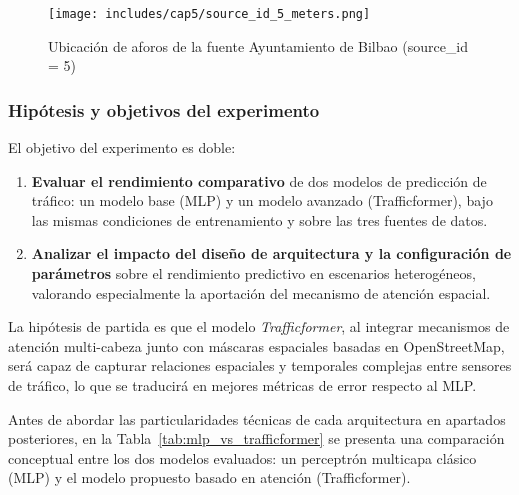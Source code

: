 \begin{figure}[H]
	\centering
	\texttt{[image: includes/cap5/source\_id\_5\_meters.png]}
	\caption{Ubicación de aforos de la fuente Ayuntamiento de Bilbao (source\_id = 5)}
	\label{fig:sourceid5_map}
\end{figure}

\subsubsection*{Hipótesis y objetivos del experimento}

El objetivo del experimento es doble:

\begin{enumerate}
	\item \textbf{Evaluar el rendimiento comparativo} de dos modelos de predicción de tráfico: un modelo base (MLP) y un modelo avanzado (Trafficformer), bajo las mismas condiciones de entrenamiento y sobre las tres fuentes de datos.
	\item \textbf{Analizar el impacto del diseño de arquitectura y la configuración de parámetros} sobre el rendimiento predictivo en escenarios heterogéneos, valorando especialmente la aportación del mecanismo de atención espacial.
\end{enumerate}

La hipótesis de partida es que el modelo \textit{Trafficformer}, al integrar mecanismos de atención multi-cabeza junto con máscaras espaciales basadas en OpenStreetMap, será capaz de capturar relaciones espaciales y temporales complejas entre sensores de tráfico, lo que se traducirá en mejores métricas de error respecto al MLP.

Antes de abordar las particularidades técnicas de cada arquitectura en apartados posteriores, en la Tabla~\ref{tab:mlp_vs_trafficformer} se presenta una comparación conceptual entre los dos modelos evaluados: un perceptrón multicapa clásico (MLP) y el modelo propuesto basado en atención (Trafficformer).

